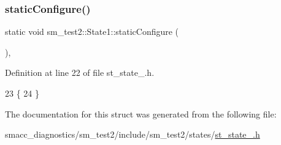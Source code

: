 \subsubsection{\texorpdfstring{static\+Configure()}{staticConfigure()}}
{\footnotesize\ttfamily static void sm\+\_\+test2\+::\+State1\+::static\+Configure (\begin{DoxyParamCaption}{ }\end{DoxyParamCaption})\hspace{0.3cm}{\ttfamily [inline]}, {\ttfamily [static]}}



Definition at line 22 of file st\+\_\+state\+\_.\+h.


\begin{DoxyCode}
23     \{
24     \}
\end{DoxyCode}


The documentation for this struct was generated from the following file\+:\begin{DoxyCompactItemize}
\item 
smacc\+\_\+diagnostics/sm\+\_\+test2/include/sm\+\_\+test2/states/\hyperlink{smacc__diagnostics_2sm__test2_2include_2sm__test2_2states_2st__state__1_8h}{st\+\_\+state\+\_.\+h}\end{DoxyCompactItemize}

